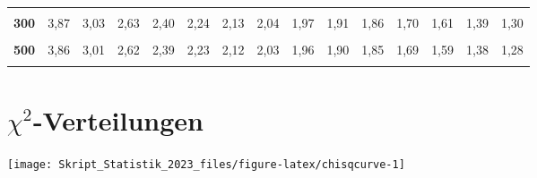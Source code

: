 \documentclass[
  11pt,
  ngerman,
  a4paper,
]{report}
\begin{document}
\begin{table}[H]
{\begin{tabular}{>{}r|rrrrrrrrrrrrrr}
\textbf{\cellcolor{gray!6}{200}} & \cellcolor{gray!6}{3,89} & \cellcolor{gray!6}{3,04} & \cellcolor{gray!6}{2,65} & \cellcolor{gray!6}{2,42} & \cellcolor{gray!6}{2,26} & \cellcolor{gray!6}{2,14} & \cellcolor{gray!6}{2,06} & \cellcolor{gray!6}{1,98} & \cellcolor{gray!6}{1,93} & \cellcolor{gray!6}{1,88} & \cellcolor{gray!6}{1,72} & \cellcolor{gray!6}{1,62} & \cellcolor{gray!6}{1,41} & \cellcolor{gray!6}{1,32}\\
\textbf{300} & 3,87 & 3,03 & 2,63 & 2,40 & 2,24 & 2,13 & 2,04 & 1,97 & 1,91 & 1,86 & 1,70 & 1,61 & 1,39 & 1,30\\
\textbf{\cellcolor{gray!6}{400}} & \cellcolor{gray!6}{3,86} & \cellcolor{gray!6}{3,02} & \cellcolor{gray!6}{2,63} & \cellcolor{gray!6}{2,39} & \cellcolor{gray!6}{2,24} & \cellcolor{gray!6}{2,12} & \cellcolor{gray!6}{2,03} & \cellcolor{gray!6}{1,96} & \cellcolor{gray!6}{1,90} & \cellcolor{gray!6}{1,85} & \cellcolor{gray!6}{1,69} & \cellcolor{gray!6}{1,60} & \cellcolor{gray!6}{1,38} & \cellcolor{gray!6}{1,28}\\
\textbf{500} & 3,86 & 3,01 & 2,62 & 2,39 & 2,23 & 2,12 & 2,03 & 1,96 & 1,90 & 1,85 & 1,69 & 1,59 & 1,38 & 1,28\\
\addlinespace
\textbf{\cellcolor{gray!6}{1000}} & \cellcolor{gray!6}{3,85} & \cellcolor{gray!6}{3,00} & \cellcolor{gray!6}{2,61} & \cellcolor{gray!6}{2,38} & \cellcolor{gray!6}{2,22} & \cellcolor{gray!6}{2,11} & \cellcolor{gray!6}{2,02} & \cellcolor{gray!6}{1,95} & \cellcolor{gray!6}{1,89} & \cellcolor{gray!6}{1,84} & \cellcolor{gray!6}{1,68} & \cellcolor{gray!6}{1,58} & \cellcolor{gray!6}{1,36} & \cellcolor{gray!6}{1,26}\\
\bottomrule
\end{tabular}}
\end{table}

\pagebreak

\hypertarget{tabelle-chisq}{%
\section*{\texorpdfstring{\(\chi^2\)-Verteilungen}{\textbackslash chi\^{}2-Verteilungen}}\label{tabelle-chisq}}

\begin{center}\texttt{[image: Skript\_Statistik\_2023\_files/figure-latex/chisqcurve-1]} \end{center}
\end{document}
